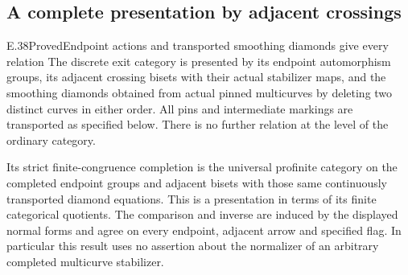 \subsection{A complete presentation by adjacent crossings}

\begin{result}{E.38}{Proved}{Endpoint actions and transported smoothing diamonds give every relation}
The discrete exit category is presented by its endpoint automorphism
groups, its adjacent crossing bisets with their actual stabilizer
maps, and the smoothing diamonds obtained from actual pinned
multicurves by deleting two distinct curves in either order.
All pins and intermediate markings are transported as specified below.
There is no further relation at the level of the ordinary category.

Its strict finite-congruence completion is the universal profinite
category on the completed endpoint groups and adjacent bisets with
those same continuously transported diamond equations.  This is a
presentation in terms of its finite categorical quotients.  The
comparison and inverse are induced by the displayed normal forms
and agree on every endpoint, adjacent arrow and specified flag.
In particular this result uses no assertion about the normalizer of
an arbitrary completed multicurve stabilizer.
\end{result}
